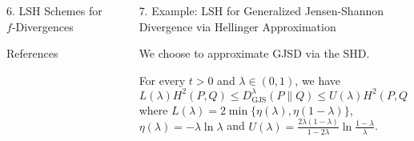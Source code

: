 \documentclass[final]{beamer}
\newcommand{\wjs}[3]{D_{\mathrm{GJS}}^{#1}( #2 \parallel #3 )}
\newlength{\sepwid}
\newlength{\onecolwid}
\newlength{\threecolwid}
\begin{document}
\begin{frame}[t]
\begin{columns}[t]
\begin{column}{\onecolwid}
\begin{block}{6. LSH Schemes for $ f $-Divergences}
	
\end{block}

\begin{block}{References}
\small
		
		
	\end{block}
\end{column} %
 		\begin{column}{\sepwid}\end{column} %
\begin{column}{\threecolwid} %
	\vspace{-40pt}
	
	\begin{block}{7. Example: LSH for Generalized Jensen-Shannon 
			Divergence via Hellinger Approximation}
		
		
		We choose to approximate GJSD via the SHD.

		For every  $ 
		t>0 $ 
		and $ \lambda\in (0,1) $, we have
		\begin{equation*}
		L(\lambda)H^2(P, Q)\le 	\wjs{\lambda}{P}{Q}
		\le  U(\lambda)H^2(P, Q)\le 
		H^2(P, 
		Q) ,
		\end{equation*}
		where $ L(\lambda) = 2 \min\{ \eta(\lambda), 
		\eta(1-\lambda) \} $, $ \eta(\lambda) = -\lambda \ln \lambda $ and 
		$ 
		U(\lambda) = 
		\frac{2\lambda(1-\lambda)}{1-2\lambda}\ln \frac{1-\lambda}{\lambda} 
		$.
		

\end{block}
\end{column}
\end{columns}
\end{frame}
\end{document}
